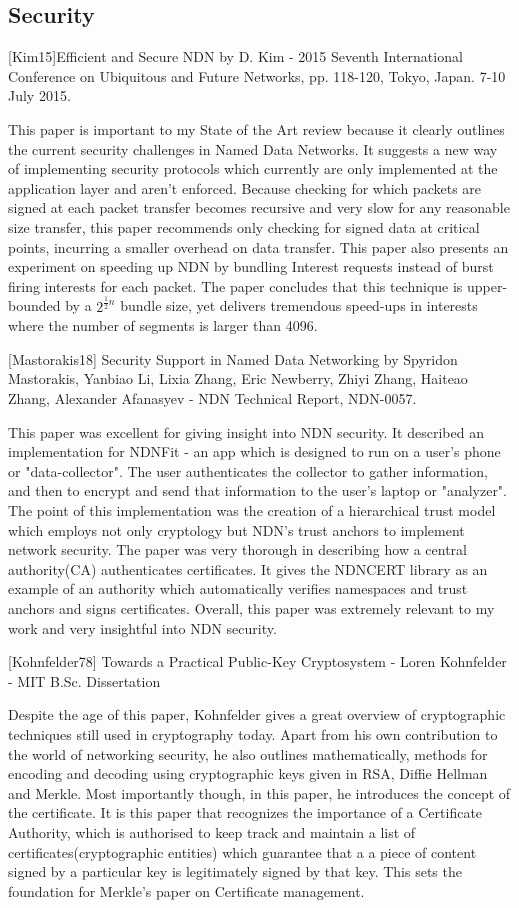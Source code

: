\subsection{Security}
[Kim15]Efficient and Secure NDN by D. Kim - 2015 Seventh International Conference on Ubiquitous and Future Networks, pp. 118-120, Tokyo, Japan. 7-10 July 2015.

This paper is important to my State of the Art review because it clearly outlines the current security challenges in Named Data Networks. It suggests a new way of implementing security protocols which currently are only implemented at the application layer and aren’t enforced. Because checking for which packets are signed at each packet transfer becomes recursive and very slow for any reasonable size transfer, this paper recommends only checking for signed data at critical points, incurring a smaller overhead on data transfer. This paper also presents an experiment on speeding up NDN by bundling Interest requests instead of burst firing interests for each packet. The paper concludes that this technique is upper-bounded by a $2^{\frac{1}{2}n}$ bundle size, yet delivers tremendous speed-ups in interests where the number of segments is larger than 4096.\par

[Mastorakis18] Security Support in Named Data Networking by Spyridon Mastorakis, Yanbiao Li, Lixia Zhang, Eric Newberry, Zhiyi Zhang, Haiteao Zhang, Alexander Afanasyev - NDN Technical Report, NDN-0057.

This paper was excellent for giving insight into NDN security. It described an implementation for NDNFit - an app which is designed to run on a user's phone or "data-collector". The user authenticates the collector to gather information, and then to encrypt and send that information to the user's laptop or "analyzer". The point of this implementation was the creation of a hierarchical trust model which employs not only cryptology but NDN's trust anchors to implement network security. The paper was very thorough in describing how a central authority(CA) authenticates certificates. It gives the NDNCERT library as an example of an authority which automatically verifies namespaces and trust anchors and signs certificates. Overall, this paper was extremely relevant to my work and very insightful into NDN security.

[Kohnfelder78] Towards a Practical Public-Key Cryptosystem - Loren Kohnfelder - MIT B.Sc. Dissertation

Despite the age of this paper, Kohnfelder gives a great overview of cryptographic techniques still used in cryptography today. Apart from his own contribution to the world of networking security, he also outlines mathematically, methods for encoding and decoding using cryptographic keys given in RSA, Diffie Hellman and Merkle. Most importantly though, in this paper, he introduces the concept of the certificate. It is this paper that recognizes the importance of a Certificate Authority, which is authorised to keep track and maintain a list of certificates(cryptographic entities) which guarantee that a a piece of content signed by a particular key is legitimately signed by that key. This sets the foundation for Merkle's paper on Certificate management.

